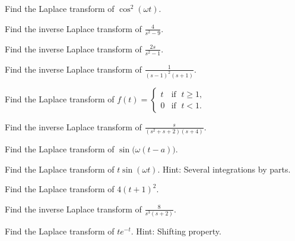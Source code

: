 \begin{exercise}
Find the Laplace transform of $\cos^2 (\omega t)$.
\end{exercise}

\begin{exercise}
Find the inverse Laplace transform of $\frac{4}{s^2-9}$.
\end{exercise}

\begin{exercise}
Find the inverse Laplace transform of $\frac{2s}{s^2-1}$.
\end{exercise}

\begin{exercise}
Find the inverse Laplace transform of $\frac{1}{{(s-1)}^2(s+1)}$.
\end{exercise}

\begin{exercise}
Find the Laplace transform of $f(t) =
\begin{cases}
t & \text{if } \; t \geq 1, \\
0 & \text{if } \; t < 1.
\end{cases}$
\end{exercise}

\begin{exercise}
Find the inverse Laplace transform of $\frac{s}{(s^2+s+2)(s+4)}$.
\end{exercise}

\begin{exercise}
Find the Laplace transform of $\sin\bigl(\omega (t-a)\bigr)$.
\end{exercise}

\begin{exercise}
Find the Laplace transform of $t\sin(\omega t)$.  Hint: Several integrations
by parts.
\end{exercise}

\setcounter{exercise}{100}

\begin{exercise}
Find the Laplace transform of $4{(t+1)}^2$.
\end{exercise}

\begin{exercise}
Find the inverse Laplace transform of $\frac{8}{s^3(s+2)}$.
\end{exercise}

\begin{exercise}
Find the Laplace transform of $te^{-t}$.  Hint: Shifting property.
\end{exercise}

